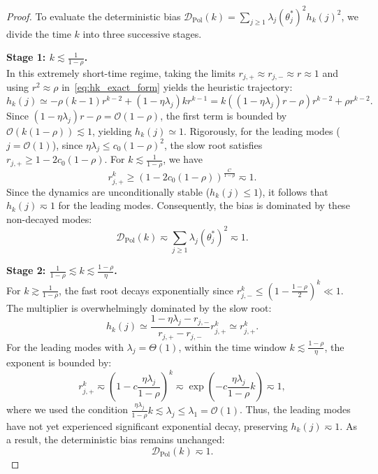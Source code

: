 \begin{proof}
To evaluate the deterministic bias $\mathcal{D}_{\mathrm{Pol}}(k) = \sum_{j\ge1}\lambda_j(\theta_j^*)^2 h_k(j)^2$, we divide the time $k$ into three successive stages.

\textbf{Stage 1: $k \lesssim \frac{1}{1-\rho}$.} \\
In this extremely short-time regime, taking the limits $r_{j,+}\approx r_{j,-} \approx r \approx 1$ and using $r^2 \approx \rho$ in~\eqref{eq:hk_exact_form} yields the heuristic trajectory:
\[
    h_k(j) \simeq -\rho(k-1)r^{k-2} + (1-\eta\lambda_j)k r^{k-1} = k\left((1-\eta\lambda_j)r - \rho \right)r^{k-2} + \rho r^{k-2}.
\]
Since $(1-\eta\lambda_j)r - \rho = \mathcal{O}(1-\rho)$, the first term is bounded by $\mathcal{O}(k(1-\rho)) \lesssim 1$, yielding $h_k(j) \simeq 1$. 
Rigorously, for the leading modes ($j=\mathcal{O}(1)$), since $\eta\lambda_j \le c_0(1-\rho)^2$, the slow root satisfies $r_{j,+} \ge 1 - 2c_0(1-\rho)$. For $k \lesssim \frac{1}{1-\rho}$, we have
\[
    r_{j,+}^k \ge \left(1 - 2c_0(1-\rho)\right)^{\frac{C}{1-\rho}} \eqsim 1.
\]
Since the dynamics are unconditionally stable ($h_k(j) \le 1$), it follows that $h_k(j) \eqsim 1$ for the leading modes. Consequently, the bias is dominated by these non-decayed modes:
\[
    \mathcal{D}_{\mathrm{Pol}}(k) \eqsim \sum_{j\ge1}\lambda_j(\theta_j^*)^2 \eqsim 1.
\]

\textbf{Stage 2: $\frac{1}{1-\rho} \lesssim k \lesssim \frac{1-\rho}{\eta}$.} \\
For $k \gtrsim \frac{1}{1-\rho}$, the fast root decays exponentially since $r_{j,-}^k \le \left(1-\frac{1-\rho}{2}\right)^k \ll 1$. The multiplier is overwhelmingly dominated by the slow root:
\[
    h_k(j) \simeq \frac{1-\eta\lambda_j - r_{j,-}}{r_{j,+} - r_{j,-}} r_{j,+}^k \simeq r_{j,+}^k.
\]
For the leading modes with $\lambda_j = \Theta(1)$, within the time window $k \lesssim \frac{1-\rho}{\eta}$, the exponent is bounded by:
\[
    r_{j,+}^k \eqsim \left(1 - c\frac{\eta\lambda_j}{1-\rho}\right)^k \eqsim \exp\left(-c\frac{\eta\lambda_j}{1-\rho}k\right) \eqsim 1,
\]
where we used the condition $\frac{\eta\lambda_j}{1-\rho}k \lesssim \lambda_j \le \lambda_1 = \mathcal{O}(1)$. Thus, the leading modes have not yet experienced significant exponential decay, preserving $h_k(j) \eqsim 1$. As a result, the deterministic bias remains unchanged:
\[
    \mathcal{D}_{\mathrm{Pol}}(k) \eqsim 1.
\]


\end{proof}
